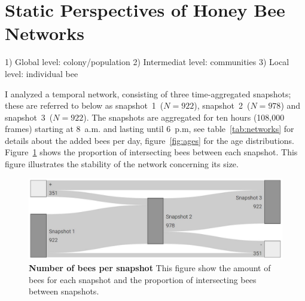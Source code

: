 \section{Static Perspectives of Honey Bee Networks}

1) Global level: colony/population
2) Intermediat level: communities
3) Local level: individual bee

I analyzed a temporal network, consisting of three time-aggregated snapshots; these are referred to below as snapshot~1~($N=922$), snapshot~2~($N=978$) and snapshot~3~($N=922$). 
The snapshots are aggregated for ten hours (108,000 frames) starting at 8~a.m. and lasting until 6~p.m, see table~\ref{tab:networks} for details about the added bees per day,  figure~\ref{fig:ages} for the age distributions. Figure~\ref{fig:network-matching} shows the proportion of intersecting bees between each snapshot. This figure illustrates the stability of the network concerning its size. 



\begin{figure}[htb]
	\centering
	\includegraphics[width=.8\textwidth]{Figures/network_matching}
	\caption[Number of bees per snapshot]{\textbf{Number of bees per snapshot} This figure show the amount of bees for each snapshot and the proportion of intersecting bees between snapshots.}
	\label{fig:network-matching}
\end{figure}



